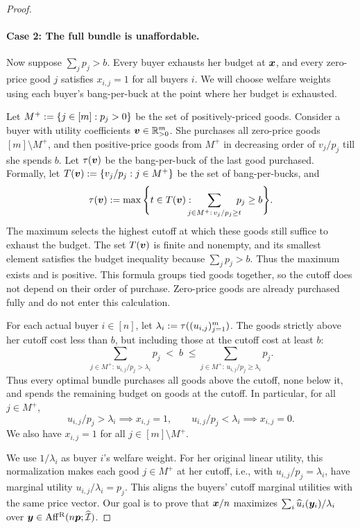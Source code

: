 \begin{proof}
\paragraph{Case 2: The full bundle is unaffordable.}
Now suppose $\sum_j p_j > b$. Every buyer exhausts her budget at $\bm{x}$,
and every zero-price good $j$ satisfies $x_{i,j} = 1$ for all buyers $i$.
We will choose welfare weights using each buyer's bang-per-buck at the point where her budget is exhausted.

Let $M^+ := \{j \in [m]: p_j > 0\}$ be the set of positively-priced goods.
Consider a buyer with utility coefficients $\bm{v} \in \mathbb{R}_{>0}^m$.
She purchases all zero-price goods $[m] \setminus M^+$,
and then positive-price goods from $M^+$ in decreasing order of $v_j/p_j$ till she spends $b$.
Let $\tau(\bm{v})$ be the bang-per-buck of the last good purchased.
Formally, let $T(\bm{v}) := \{v_j/p_j: j \in M^+\}$ be the set of bang-per-bucks, and
\[ \tau(\vvec) \defeq \max\Bigg\{t \in T(\vvec): \!\!\!\! \sum_{j \in M^+:\, v_j/p_j \ge t} \!\!\!\! p_j \ge b\Bigg\}. \]
The maximum selects the highest cutoff at which these goods still suffice to exhaust the budget.
The set $T(\bm{v})$ is finite and nonempty, and its smallest element satisfies the budget inequality because $\sum_j p_j>b$.
Thus the maximum exists and is positive.
This formula groups tied goods together, so the cutoff does not depend on their order of purchase.
Zero-price goods are already purchased fully and do not enter this calculation.

For each actual buyer $i \in [n]$, let $\lambda_i := \tau((u_{i,j})_{j=1}^m)$.
The goods strictly above her cutoff cost less than $b$,
but including those at the cutoff cost at least $b$:
\[ \sum_{j \in M^+:\, u_{i,j}/p_j > \lambda_i} \!\!\!\!\!\! p_j \; < \; b \;
    \le \!\!\!\! \sum_{j \in M^+:\, u_{i,j}/p_j \ge \lambda_i} \!\!\!\!\!\! p_j. \]
Thus every optimal bundle purchases all goods above the cutoff, none below it,
and spends the remaining budget on goods at the cutoff.
In particular, for all $j \in M^+$,
\begin{equation}
\label{eq:rivalize-cutoff}
u_{i,j}/p_j > \lambda_i \implies x_{i,j} = 1,
\qquad
u_{i,j}/p_j < \lambda_i \implies x_{i,j} = 0.
\end{equation}
We also have $x_{i,j} = 1$ for all $j \in [m] \setminus M^+$.

We use $1/\lambda_i$ as buyer $i$'s welfare weight.
For her original linear utility, this normalization makes each good $j \in M^+$ at her cutoff,
i.e., with $u_{i,j}/p_j=\lambda_i$, have marginal utility $u_{i,j}/\lambda_i=p_j$.
This aligns the buyers' cutoff marginal utilities with the same price vector.
Our goal is to prove that $\bm{x}/n$ maximizes
$\sum_i \widehat{u}_i(\bm{y}_i)/\lambda_i$ over $\bm{y} \in \operatorname{Aff^{\mathrm{R}}}(n\bm{p}; \widehat{\mathcal{I}})$.


\end{proof}
